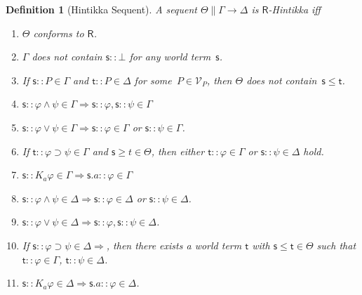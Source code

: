 \documentclass[doctor]{iscs-thesis}
\newcommand{\pvar}{\mathcal V_P}
\newtheorem{definition}{Definition}
\begin{document}
\begin{definition}[Hintikka Sequent]
 A sequent $\Theta\parallel \Gamma\longrightarrow\Delta$ is $\mathsf R$-Hintikka
 iff
 \begin{enumerate}
  \item $\Theta$ conforms to $\mathsf R$.
  \item $\Gamma$ does not contain $\mathsf s::\bot$ for any world
	term~$\mathsf s$.
  \item If $\mathsf s::P\in \Gamma$ and $\mathsf t::P\in\Delta$ for
	some~$P\in\pvar$\!, then
	$\Theta$ does not contain~$\mathsf s\le \mathsf t$.
  \item $\mathsf s::\varphi\wedge\psi\in\Gamma\Longrightarrow
	\mathsf s::\varphi,\mathsf s::\psi\in\Gamma$
  \item $\mathsf s::\varphi\vee\psi\in\Gamma
	\Longrightarrow \mathsf s::\varphi\in\Gamma$ or
	$\mathsf s::\psi\in\Gamma$.
  \item If $\mathsf t::\varphi\supset\psi
	\in\Gamma$ and $\mathsf s\ge t\in \Theta$,
	then 
	either
	$\mathsf t::\varphi\in\Gamma$ or
	$\mathsf s::\psi\in\Delta$ hold.
  \item $\mathsf s::K_a\varphi\in\Gamma
	\Longrightarrow \mathsf s.a::\varphi\in\Gamma$
  \item $\mathsf s::\varphi\wedge\psi
	\in\Delta\Longrightarrow \mathsf
	s::\varphi\in\Delta$
	or $\mathsf s::\psi\in\Delta$.
  \item $\mathsf s::\varphi\vee\psi\in\Delta
	\Longrightarrow \mathsf s::\varphi, \mathsf s::\psi\in
	\Delta$.
  \item If $\mathsf s::\varphi\supset\psi\in\Delta\Longrightarrow$, then
	there exists a world term $\mathsf t$ with $\mathsf
	s\le \mathsf t\in\Theta$ such that
	$\mathsf t::\varphi\in\Gamma$, $\mathsf t::\psi\in\Delta$.
  \item $\mathsf s:: K_a\varphi\in\Delta\Longrightarrow
	\mathsf s.a::\varphi\in\Delta$.
 \end{enumerate}
\end{definition}
\end{document}
